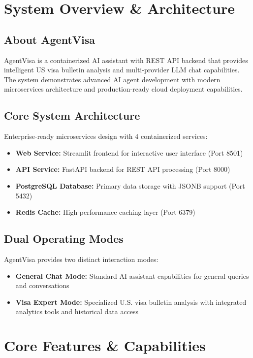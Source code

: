 \documentclass[11pt,a4paper]{article}
\begin{document}
\newpage
\section{System Overview \& Architecture}

\subsection{About AgentVisa}
AgentVisa is a containerized AI assistant with REST API backend that provides intelligent US visa bulletin analysis and multi-provider LLM chat capabilities. The system demonstrates advanced AI agent development with modern microservices architecture and production-ready cloud deployment capabilities.

\subsection{Core System Architecture}
Enterprise-ready microservices design with 4 containerized services:

\begin{itemize}[itemsep=0.3em]
    \item \textbf{Web Service:} Streamlit frontend for interactive user interface (Port 8501)
    \item \textbf{API Service:} FastAPI backend for REST API processing (Port 8000)
    \item \textbf{PostgreSQL Database:} Primary data storage with JSONB support (Port 5432)
    \item \textbf{Redis Cache:} High-performance caching layer (Port 6379)
\end{itemize}

\subsection{Dual Operating Modes}
AgentVisa provides two distinct interaction modes:
\begin{itemize}[itemsep=0.3em]
    \item \textbf{General Chat Mode:} Standard AI assistant capabilities for general queries and conversations
    \item \textbf{Visa Expert Mode:} Specialized U.S. visa bulletin analysis with integrated analytics tools and historical data access
\end{itemize}

\newpage
\section{Core Features \& Capabilities}
\end{document}
